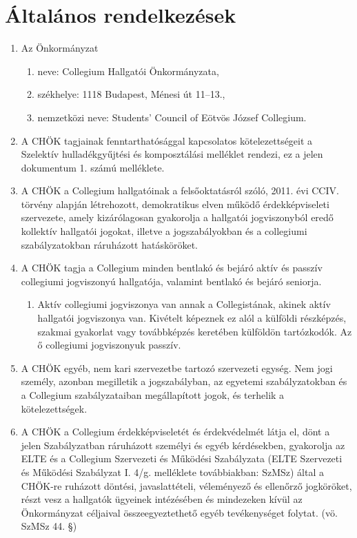\documentclass{../styles/rulebook}
\begin{document}
\section{Általános rendelkezések}
\begin{enumerate}
	\item Az Önkormányzat 
	\begin{enumerate}
		\item neve: Collegium Hallgatói Önkormányzata,
		\item székhelye: 1118 Budapest, Ménesi út 11--13.,
		\item nemzetközi neve: Students’ Council of Eötvös József Collegium.
	\end{enumerate}
	\item A CHÖK tagjainak fenntarthatósággal kapcsolatos kötelezettségeit a Szelektív hulladékgyűjtési és komposztálási melléklet rendezi, ez a jelen dokumentum 1. számú melléklete.
	\item A CHÖK a Collegium hallgatóinak a felsőoktatásról szóló, 2011. évi CCIV. törvény alapján létrehozott, demokratikus elven működő érdekképviseleti szervezete, amely kizárólagosan gyakorolja a hallgatói jogviszonyból eredő kollektív hallgatói jogokat, illetve a jogszabályokban és a collegiumi szabályzatokban ráruházott hatásköröket.
	\item A CHÖK tagja a Collegium minden bentlakó és bejáró aktív és passzív collegiumi jogviszonyú hallgatója, valamint bentlakó és bejáró seniorja.
	\begin{enumerate}
		\item Aktív collegiumi jogviszonya van annak a Collegistának, akinek aktív hallgatói jogviszonya van. Kivételt képeznek ez alól a külföldi részképzés, szakmai gyakorlat vagy továbbképzés keretében külföldön tartózkodók. Az ő collegiumi jogviszonyuk passzív.
	\end{enumerate}
	\item A CHÖK egyéb, nem kari szervezetbe tartozó szervezeti egység. Nem jogi személy, azonban megilletik a jogszabályban, az egyetemi szabályzatokban és a Collegium szabályzataiban megállapított jogok, és terhelik a kötelezettségek.
	\item A CHÖK a Collegium érdekképviseletét és érdekvédelmét látja el, dönt a jelen Szabályzatban ráruházott személyi és egyéb kérdésekben, gyakorolja az ELTE és a Collegium Szervezeti és Működési Szabályzata (ELTE Szervezeti és Működési Szabályzat I. 4/g. melléklete továbbiakban: SzMSz) által a CHÖK-re ruházott döntési, javaslattételi, véleményező és ellenőrző jogköröket, részt vesz a hallgatók ügyeinek intézésében és mindezeken kívül az Önkormányzat céljaival összeegyeztethető egyéb tevékenységet folytat. (vö. SzMSz 44. §)

\end{enumerate}
\end{document}
